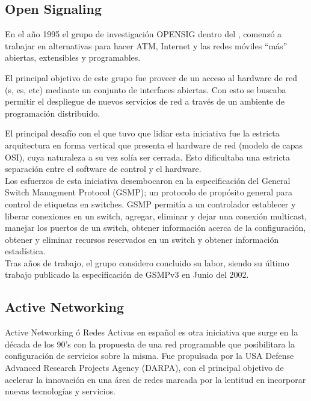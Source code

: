 \subsection{Open Signaling}
En el año 1995 el grupo de investigación OPENSIG\cite{campbell1999open} dentro del , comenzó a trabajar en alternativas para hacer ATM, Internet y las redes móviles ``más'' abiertas, extensibles y programables.

El principal objetivo de este grupo fue proveer de un acceso al hardware de red (s, es, etc) mediante un conjunto de interfaces abiertas. Con esto se buscaba permitir el despliegue de nuevos servicios de red a través de un ambiente de programación distribuido.

El principal desafío con el que tuvo que lidiar esta iniciativa fue la estricta arquitectura en forma vertical que presenta el hardware de red (modelo de capas OSI), cuya naturaleza a su vez solía ser cerrada. Esto dificultaba una estricta separación entre el software de control y el hardware.\\

Los esfuerzos de esta iniciativa desembocaron en la especificación del General Switch Managment Protocol (GSMP); un protocolo de propósito general para control de etiquetas en switches.
GSMP permitía a un controlador establecer y liberar conexiones en un switch, agregar, eliminar
y dejar una conexión multicast, manejar los puertos de un switch, obtener información acerca de la configuración, obtener y eliminar recursos reservados en un switch y obtener información estadística.\\

Tras años de trabajo, el grupo considero concluido su labor, siendo su último trabajo publicado la especificación de GSMPv3 en Junio del 2002\cite{doria2002general}.

\subsection{Active Networking}
Active Networking\citep{tennenhouse1997survey}\citep{tennenhouse2002towards}\citep{moore2001towards} \'o Redes Activas en español es otra iniciativa que surge en la década de los 90's con la propuesta de una red programable que posibilitara la configuración de servicios sobre la misma. Fue propulsada por la USA Defense Advanced Research Projects Agency (DARPA), con el principal objetivo de acelerar la innovación en una área de redes marcada por la lentitud en incorporar nuevas tecnologías y servicios.\\

